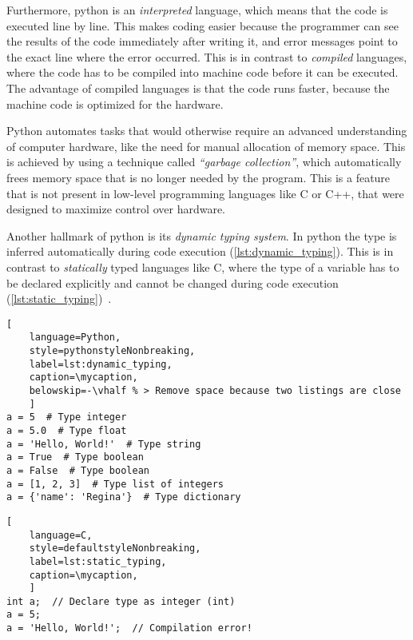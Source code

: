 Furthermore, python is an \textit{interpreted} language, which means that the
code is executed line by line. This makes coding easier because the programmer
can see the results of the code immediately after writing it, and error messages
point to the exact line where the error occurred. This is in contrast to
\textit{compiled} languages, where the code has to be compiled into machine code
before it can be executed. The advantage of compiled languages is that the code
runs faster, because the machine code is optimized for the hardware.

Python automates tasks that would otherwise require an advanced understanding of
computer hardware, like the need for manual allocation of memory space. This is
achieved by using a technique called \textit{``garbage collection''}, which
automatically frees memory space that is no longer needed by the program. This
is a feature that is not present in low-level programming languages like C or
C++, that were designed to maximize control over hardware.

Another hallmark of python is its \textit{dynamic typing system}. In python the
type  is inferred automatically during code execution
(\autoref{lst:dynamic_typing}). This is in contrast to \textit{statically} typed
languages like C, where the type of a variable has to be declared explicitly and
cannot be changed during code execution
(\autoref{lst:static_typing})~\cite{PythonLanguageReference}.

\def\mycaption{ Example of dynamic typing in python. The variable ``\texttt{a}''
    is assigned the value 5, which is of type integer. The variable ``\texttt{a}''
    is then assigned the value ``\texttt{Hello, World!}'', which is of type string.
    Python allows dynamic re-assignment of variables with different types. Note that
    code after ``\texttt{\#}'' is considered a comment and won't be executed.}
\begin{lstlisting}[
    language=Python,
    style=pythonstyleNonbreaking,
    label=lst:dynamic_typing,
    caption=\mycaption,
    belowskip=-\vhalf % > Remove space because two listings are close
    ]
a = 5  # Type integer
a = 5.0  # Type float
a = 'Hello, World!'  # Type string
a = True  # Type boolean
a = False  # Type boolean
a = [1, 2, 3]  # Type list of integers
a = {'name': 'Regina'}  # Type dictionary
\end{lstlisting}

\def\mycaption{ Example of static typing in C. The variable ``\texttt{a}'' is
    declared as an integer (\texttt{int}), and can only store integers. The
    variable ``\texttt{a}'' is then assigned the value 5, which is an integer.
    The variable ``\texttt{a}'' is then assigned the value \texttt{'Hello,
        World!'}, which is a string. This results in a compilation error, because
    the variable ``\texttt{a}'' can only store integers. Note that code after
    ``\texttt{//}'' is considered a comment and won't be executed. }
\begin{lstlisting}[
    language=C,
    style=defaultstyleNonbreaking,
    label=lst:static_typing,
    caption=\mycaption,
    ]
int a;  // Declare type as integer (int)
a = 5;
a = 'Hello, World!';  // Compilation error!
\end{lstlisting}

